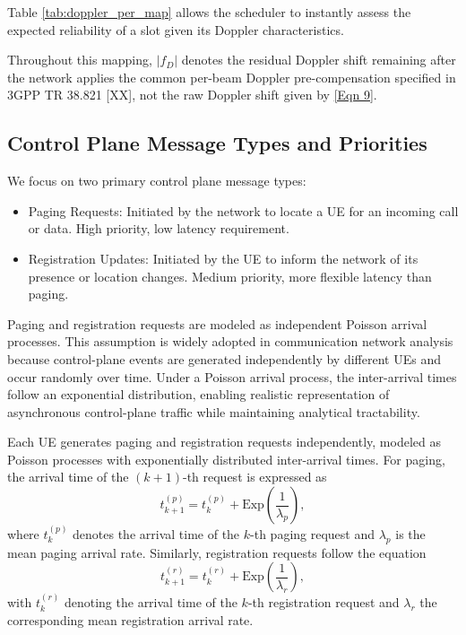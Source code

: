 \documentclass[conference]{IEEEtran}
\begin{document}
Table \ref{tab:doppler_per_map} allows the scheduler to instantly assess the expected reliability of a slot given its Doppler characteristics.

Throughout this mapping, $|f_D|$ denotes the residual Doppler shift remaining after the network applies the common per-beam Doppler pre-compensation specified in 3GPP TR 38.821 [XX], not the raw Doppler shift given by \ref{Eqn 9}.

\subsection{Control Plane Message Types and Priorities}
We focus on two primary control plane message types:
\begin{itemize}
    \item Paging Requests: Initiated by the network to locate a UE for an incoming call or data. High priority, low latency requirement.
    \item Registration Updates: Initiated by the UE to inform the network of its presence or location changes. Medium priority, more flexible latency than paging.
\end{itemize}

Paging and registration requests are modeled as independent Poisson arrival processes. This assumption is widely adopted in communication network analysis because control-plane events are generated independently by different UEs and occur randomly over time. Under a Poisson arrival process, the inter-arrival times follow an exponential distribution, enabling realistic representation of asynchronous control-plane traffic while maintaining analytical tractability.

Each UE generates paging and registration requests independently, modeled as Poisson processes with exponentially distributed inter-arrival times.
For paging, the arrival time of the \((k+1)\)-th request is expressed as
\begin{equation}
    t^{(p)}_{k+1} = t^{(p)}_{k} + \text{Exp}\!\left(\frac{1}{\lambda_p}\right),
\end{equation}
where \(t^{(p)}_{k}\) denotes the arrival time of the \(k\)-th paging request and \(\lambda_p\) is the mean paging arrival rate. Similarly, registration requests follow the equation
\begin{equation}
    t^{(r)}_{k+1} = t^{(r)}_{k} + \text{Exp}\!\left(\frac{1}{\lambda_r}\right),
\end{equation}
with \(t^{(r)}_{k}\) denoting the arrival time of the \(k\)-th registration request and \(\lambda_r\) the corresponding mean registration arrival rate.
\end{document}
